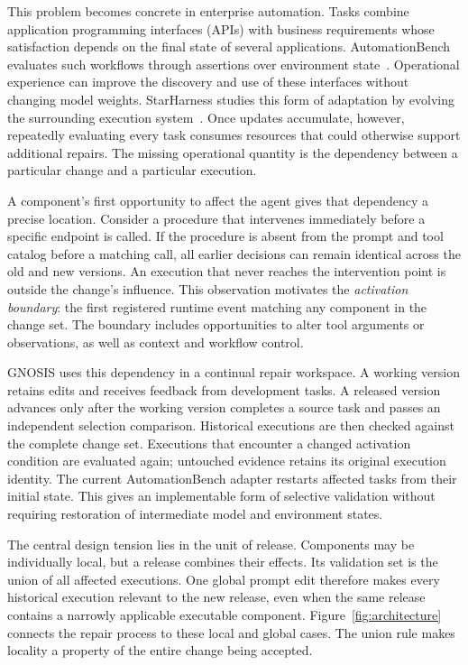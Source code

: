 \documentclass{ecai}
\newcommand{\Gnosis}{GNOSIS}
\begin{document}
This problem becomes concrete in enterprise automation. Tasks combine application programming interfaces (APIs) with business requirements whose satisfaction depends on the final state of several applications. AutomationBench evaluates such workflows through assertions over environment state~\cite{automationbench}. Operational experience can improve the discovery and use of these interfaces without changing model weights. StarHarness studies this form of adaptation by evolving the surrounding execution system~\cite{starharness}. Once updates accumulate, however, repeatedly evaluating every task consumes resources that could otherwise support additional repairs. The missing operational quantity is the dependency between a particular change and a particular execution.

A component's first opportunity to affect the agent gives that dependency a precise location. Consider a procedure that intervenes immediately before a specific endpoint is called. If the procedure is absent from the prompt and tool catalog before a matching call, all earlier decisions can remain identical across the old and new versions. An execution that never reaches the intervention point is outside the change's influence. This observation motivates the \emph{activation boundary}: the first registered runtime event matching any component in the change set. The boundary includes opportunities to alter tool arguments or observations, as well as context and workflow control.

\Gnosis{} uses this dependency in a continual repair workspace. A working version retains edits and receives feedback from development tasks. A released version advances only after the working version completes a source task and passes an independent selection comparison. Historical executions are then checked against the complete change set. Executions that encounter a changed activation condition are evaluated again; untouched evidence retains its original execution identity. The current AutomationBench adapter restarts affected tasks from their initial state. This gives an implementable form of selective validation without requiring restoration of intermediate model and environment states.

The central design tension lies in the unit of release. Components may be individually local, but a release combines their effects. Its validation set is the union of all affected executions. One global prompt edit therefore makes every historical execution relevant to the new release, even when the same release contains a narrowly applicable executable component. Figure~\ref{fig:architecture} connects the repair process to these local and global cases. The union rule makes locality a property of the entire change being accepted.
\end{document}
